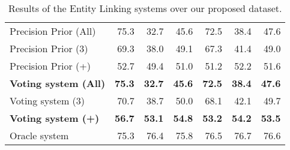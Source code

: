 \begin{table}[h!]
{\begin{tabular}{|l|rrr|rrr|}
    Precision Prior (All)                                  & 75.3                                 & 32.7                                    & 45.6                                   & 72.5                                 & 38.4                                    & 47.6                                   \\
    Precision Prior (3)                                    & 69.3                                 & 38.0                                    & 49.1                                   & 67.3                                 & 41.4                                    & 49.0                                   \\
    Precision Prior (+)                                    & 52.7                                 & 49.4                                    & 51.0                                   & 51.2                                 & 52.2                                    & 51.6                                   \\ \hline
    \textbf{Voting system (All)}                           & \textbf{75.3}                        & \textbf{32.7}                           & \textbf{45.6}                          & \textbf{72.5}                        & \textbf{38.4}                           & \textbf{47.6}                          \\
    Voting system (3)                                      & 70.7                                 & 38.7                                    & 50.0                                   & 68.1                                 & 42.1                                    & 49.7                                   \\
    \textbf{Voting system (+)}                             & \textbf{56.7}                        & \textbf{53.1}                           & \textbf{54.8}                          & \textbf{53.2}                        & \textbf{54.2}                           & \textbf{53.5}                          \\ \hline
    Oracle system                                          & 75.3                                 & 76.4                                    & 75.8                                   & 76.5                                 & 76.7                                    & 76.6                                   \\ \hline
    \end{tabular}%
    }
    \caption{Results of the Entity Linking systems over our proposed \WikiSPARQL{} dataset.}
    \label{table:elResultsWikiSparql}
\end{table}

